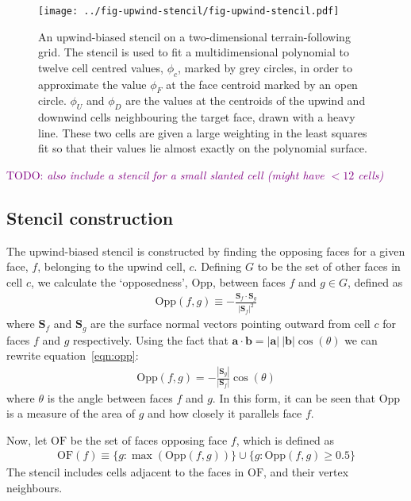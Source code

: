 \documentclass{article}
\newcommand{\TODO}[1]{\textcolor{purple}{TODO: \emph{#1}}}
\begin{document}
\begin{figure}
	\centering
	\texttt{[image: ../fig-upwind-stencil/fig-upwind-stencil.pdf]}
	\caption{An upwind-biased stencil on a two-dimensional terrain-following grid.  The stencil is used to fit a multidimensional polynomial to twelve cell centred values, $\phi_c$, marked by grey circles, in order to approximate the value $\phi_F$ at the face centroid marked by an open circle.  $\phi_U$ and $\phi_D$ are the values at the centroids of the upwind and downwind cells neighbouring the target face, drawn with a heavy line.  These two cells are given a large weighting in the least squares fit so that their values lie almost exactly on the polynomial surface.}
	\label{fig:upwind-stencil}
\end{figure}

\TODO{also include a stencil for a small slanted cell (might have $< 12$ cells)}

\subsection{Stencil construction}
The upwind-biased stencil is constructed by finding the opposing faces for a given face, $f$, belonging to the upwind cell, $c$.  Defining $G$ to be the set of other faces in cell $c$, we calculate the `opposedness', $\mathrm{Opp}$, between faces $f$ and $g \in G$, defined as
\begin{align}
	\mathrm{Opp}(f, g) \equiv - \frac{\mathbf{S}_f \cdot \mathbf{S}_g}{|\mathbf{S}_f|^2} \label{eqn:opp}
\end{align}
where $\mathbf{S}_f$ and $\mathbf{S}_g$ are the surface normal vectors pointing outward from cell $c$ for faces $f$ and $g$ respectively.
Using the fact that $\mathbf{a} \cdot \mathbf{b} = |\mathbf{a}|\:|\mathbf{b}| \cos(\theta)$ we can rewrite equation~\ref{eqn:opp}:
\begin{align}
	\mathrm{Opp}(f, g) = - \frac{|\mathbf{S}_g|}{|\mathbf{S}_f|} \cos(\theta)
\end{align}
where $\theta$ is the angle between faces $f$ and $g$.  In this form, it can be seen that $\mathrm{Opp}$ is a measure of the area of $g$ and how closely it parallels face $f$.

Now, let $\mathrm{OF}$ be the set of faces opposing face $f$, which is defined as
\begin{align}
	\mathrm{OF}(f) \equiv \{ g : \max(\mathrm{Opp}(f, g)) \} \cup \{ g : \mathrm{Opp}(f, g) \geq 0.5 \}
\end{align}
The stencil includes cells adjacent to the faces in $\mathrm{OF}$, and their vertex neighbours.
\end{document}
